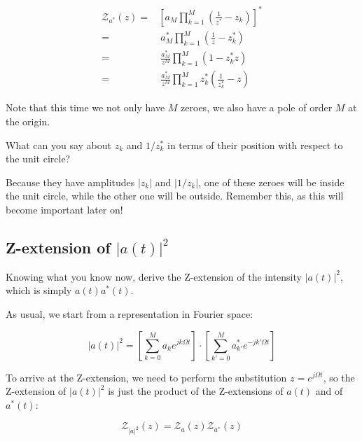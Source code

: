 \begin{align}
    \mathcal{Z}_{a^*}(z) =& \left[ a_M \prod_{k=1}^{M} \left(\frac{1}{z^*}-z_k \right) \right]^* \nonumber \\
    =& \ a_M^* \prod_{k=1}^{M} \left(\frac{1}{z}-z_k^* \right) \nonumber \\
    =& \ \frac{a_M^*}{z^M} \prod_{k=1}^{M} \left(1 - z_k^* z \right) \nonumber \\
    =& \ \frac{a_M^*}{z^M} \prod_{k=1}^{M} z_k^* \left(\frac{1}{z_k^*} - z \right) 
\end{align}

Note that this time we not only have $M$ zeroes, we also have a pole of order $M$ at the origin.

\begin{cue}
What can you say about $z_k$ and $1/z_k^*$ in terms of their position with respect to the unit circle?
\end{cue}

Because they have amplitudes $|z_k|$ and $|1/z_k|$, one of these zeroes will be inside the unit circle, while the other one will be outside. Remember this, as this will become important later on!

\pagebreak

\subsection{Z-extension of $|a(t)|^2$}

\begin{cue}
Knowing what you know now, derive the Z-extension of the intensity $|a(t)|^2$, which is simply $a(t)a^*(t)$.
\end{cue}

As usual, we start from a representation in Fourier space:

\begin{equation}
|a(t)|^2 = \left[  \sum_{k=0}^M a_k e^{jk\Omega t} \right] \cdot \left[ \sum_{k'=0}^M a_{k'}^* e^{-jk'\Omega t}\right]     
\end{equation}

To arrive at the Z-extension, we need to perform the substitution $z=e^{j\Omega t}$, so the Z-extension of $|a(t)|^2$ is just the product of the Z-extensions of $a(t)$ and of $a^*(t)$:

\begin{equation}
\mathcal{Z}_{|a|^2}(z) = \mathcal{Z}_a(z) \mathcal{Z}_{a^*}(z)
\end{equation}


